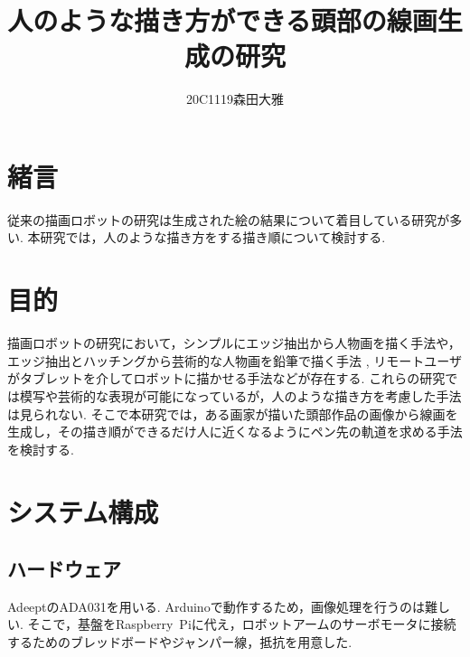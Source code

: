 \documentclass[10pt]{jarticle}
\begin{document}
    
    \makeatletter
    \title{人のような描き方ができる頭部の線画生成の研究}{}
    
    \author{20C1119\hspace{.5zw}森田大雅}
    
    \makeatother
    
    
    
    \maketitle
    
    
    \section{緒\hspace{2zw}言}%
	従来の描画ロボットの研究は生成された絵の結果について着目している研究が多い.
	本研究では，人のような描き方をする描き順について検討する.

    \section{目的}
	描画ロボットの研究において，シンプルにエッジ抽出から人物画を描く手法\cite{1}や，エッジ抽出とハッチングから芸術的な人物画を鉛筆で描く手法\cite{2} , リモートユーザがタブレットを介してロボットに描かせる手法\cite{3}などが存在する.
	これらの研究では模写や芸術的な表現が可能になっているが，人のような描き方を考慮した手法は見られない.
	そこで本研究では，ある画家が描いた頭部作品の画像から線画を生成し，その描き順ができるだけ人に近くなるようにペン先の軌道を求める手法を検討する.
    
    \section{システム構成}
	\subsection{ハードウェア}
	AdeeptのADA031を用いる. Arduinoで動作するため，画像処理を行うのは難しい.
	そこで，基盤をRaspberry\ Piに代え，ロボットアームのサーボモータに接続するためのブレッドボードやジャンパー線，抵抗を用意した.
\end{document}
